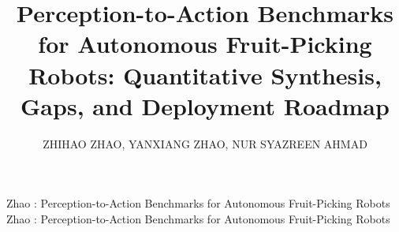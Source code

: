 \documentclass{ieeeaccess}
\begin{document}


\title{Perception-to-Action Benchmarks for Autonomous Fruit-Picking Robots: Quantitative Synthesis, Gaps, and Deployment Roadmap}    




\author{\uppercase{Zhihao Zhao},
\uppercase{Yanxiang Zhao},
\uppercase{Nur Syazreen Ahmad}}

\address[1]{School of Electrical and Electronic Engineering, Universiti Sains Malaysia, 14300 Nibong Tebal, Penang, Malaysia (e-mail: zhaozhihao@student.usm.my, yanxiang.zhao@csu.edu.cn, syazreen@usm.my)}
\address[2]{YanTai Engineering and Technology College, 264006 YanTai, Shandong, China}


\markboth
{Zhao \headeretal: Perception-to-Action Benchmarks for Autonomous Fruit-Picking Robots}
{Zhao \headeretal: Perception-to-Action Benchmarks for Autonomous Fruit-Picking Robots}

\end{document}
